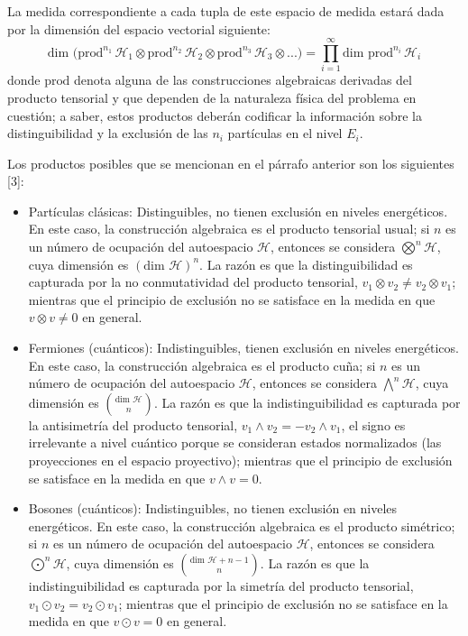 \documentclass[11pt]{article}
\begin{document}
La medida correspondiente a cada tupla de este espacio de medida estará dada por
la dimensión del espacio vectorial siguiente:
$$
\text{dim } \big( \text{prod}^{n_1} \, \mathcal{H}_1 \otimes \text{prod}^{n_2} \,
\mathcal{H}_2 \otimes \text{prod}^{n_3} \, \mathcal{H}_3 \otimes ... \big) =
\prod_{i=1}^\infty \text{dim } \text{prod}^{n_i} \, \mathcal{H}_i
$$
donde \(\text{prod}\) denota alguna de las construcciones algebraicas derivadas
del producto tensorial y que dependen de la naturaleza física del problema en
cuestión; a saber, estos productos deberán codificar la información sobre la
distinguibilidad y la exclusión de las \(n_i\) partículas en el nivel \(E_i\).

Los productos posibles que se mencionan en el párrafo anterior son los
siguientes [3]:
\begin{itemize}
\item Partículas clásicas: Distinguibles, no tienen exclusión en niveles
energéticos. En este caso, la construcción algebraica es el producto tensorial
usual; si \(n\) es un número de ocupación del autoespacio \(\mathcal{H}\),
entonces se considera \(\bigotimes^n \mathcal{H}\), cuya dimensión es
\((\text{dim } \mathcal{H})^n\). La razón es que la distinguibilidad es
capturada por la no conmutatividad del producto tensorial, \(v_1 \otimes v_2
  \neq v_2 \otimes v_1\); mientras que el principio de exclusión no se satisface
en la medida en que \(v \otimes v \neq 0\) en general.

\item Fermiones (cuánticos): Indistinguibles, tienen exclusión en niveles
energéticos. En este caso, la construcción algebraica es el producto cuña; si
\(n\) es un número de ocupación del autoespacio \(\mathcal{H}\), entonces se
considera \(\bigwedge^n \mathcal{H}\), cuya dimensión es \(\text{dim }
  \mathcal{H} \choose n\). La razón es que la indistinguibilidad es capturada
por la antisimetría del producto tensorial, \(v_1 \wedge v_2 = -v_2 \wedge
  v_1\), el signo es irrelevante a nivel cuántico porque se consideran estados
normalizados (las proyecciones en el espacio proyectivo); mientras que el
principio de exclusión se satisface en la medida en que \(v \wedge v = 0\).

\item Bosones (cuánticos): Indistinguibles, no tienen exclusión en niveles
energéticos. En este caso, la construcción algebraica es el producto simétrico; si
\(n\) es un número de ocupación del autoespacio \(\mathcal{H}\), entonces se
considera \(\bigodot^n \mathcal{H}\), cuya dimensión es \(\text{dim }
  \mathcal{H} + n -1 \choose n\). La razón es que la indistinguibilidad es capturada
por la simetría del producto tensorial, \(v_1 \odot v_2 = v_2 \odot
  v_1\); mientras que el
principio de exclusión no se satisface en la medida en que \(v \odot v = 0\)
en general.
\end{itemize}
\end{document}
